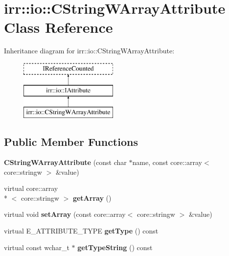 \hypertarget{classirr_1_1io_1_1_c_string_w_array_attribute}{\section{irr\-:\-:io\-:\-:C\-String\-W\-Array\-Attribute Class Reference}
\label{classirr_1_1io_1_1_c_string_w_array_attribute}
}
Inheritance diagram for irr\-:\-:io\-:\-:C\-String\-W\-Array\-Attribute\-:\begin{figure}[H]
\begin{center}
\leavevmode
\includegraphics[height=3.000000cm]{classirr_1_1io_1_1_c_string_w_array_attribute}
\end{center}
\end{figure}
\subsection*{Public Member Functions}
\begin{DoxyCompactItemize}
\item 
\hypertarget{classirr_1_1io_1_1_c_string_w_array_attribute_af40a5951b87b07f1ebb11a19d091b990}{{\bfseries C\-String\-W\-Array\-Attribute} (const char $\ast$name, const core\-::array$<$ core\-::stringw $>$ \&value)}\label{classirr_1_1io_1_1_c_string_w_array_attribute_af40a5951b87b07f1ebb11a19d091b990}

\item 
\hypertarget{classirr_1_1io_1_1_c_string_w_array_attribute_a594c31ac9905099047135e1c4d210e0d}{virtual core\-::array\\*
$<$ core\-::stringw $>$ {\bfseries get\-Array} ()}\label{classirr_1_1io_1_1_c_string_w_array_attribute_a594c31ac9905099047135e1c4d210e0d}

\item 
\hypertarget{classirr_1_1io_1_1_c_string_w_array_attribute_a9bbd94a2bbad88b4aa3ad32170c20a3c}{virtual void {\bfseries set\-Array} (const core\-::array$<$ core\-::stringw $>$ \&value)}\label{classirr_1_1io_1_1_c_string_w_array_attribute_a9bbd94a2bbad88b4aa3ad32170c20a3c}

\item 
\hypertarget{classirr_1_1io_1_1_c_string_w_array_attribute_a17e8ba7bf32b2b9c818197ca02483daa}{virtual E\-\_\-\-A\-T\-T\-R\-I\-B\-U\-T\-E\-\_\-\-T\-Y\-P\-E {\bfseries get\-Type} () const }\label{classirr_1_1io_1_1_c_string_w_array_attribute_a17e8ba7bf32b2b9c818197ca02483daa}

\item 
\hypertarget{classirr_1_1io_1_1_c_string_w_array_attribute_a4225401e6da2c342f54937b5a0aba084}{virtual const wchar\-\_\-t $\ast$ {\bfseries get\-Type\-String} () const }\label{classirr_1_1io_1_1_c_string_w_array_attribute_a4225401e6da2c342f54937b5a0aba084}

\end{DoxyCompactItemize}
